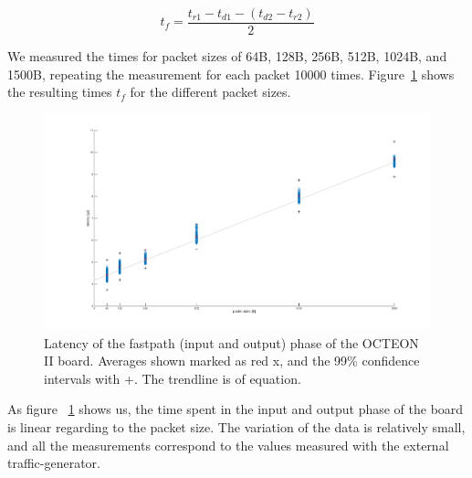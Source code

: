 \begin{equation}
  \label{eq:1}
  t_{f} = \frac{t_{r1} - t_{d1} - (t_{d2} - t_{r2})}{2}
\end{equation}

We measured the times for packet sizes of 64B, 128B, 256B, 512B, 1024B, and 1500B, repeating the measurement for each packet 10000 times. Figure~\ref{fig:comm-latency} shows the resulting times $t_{f}$ for the different packet sizes.

\begin{figure}[h]
  \begin{center}
    \includegraphics[width=\textwidth]{images/comm-latency.pdf}
    \caption{Latency of the fastpath (input and output) phase of the OCTEON II board. Averages shown marked as red x, and the 99\% confidence intervals with +. The trendline is of equation.}
    \label{fig:comm-latency}
  \end{center}
\end{figure}

As figure ~\ref{fig:comm-latency} shows us, the time spent in the input and output phase of the board is linear regarding to the packet size. The variation of the data is relatively small, and all the measurements correspond to the values measured with the external traffic-generator.


